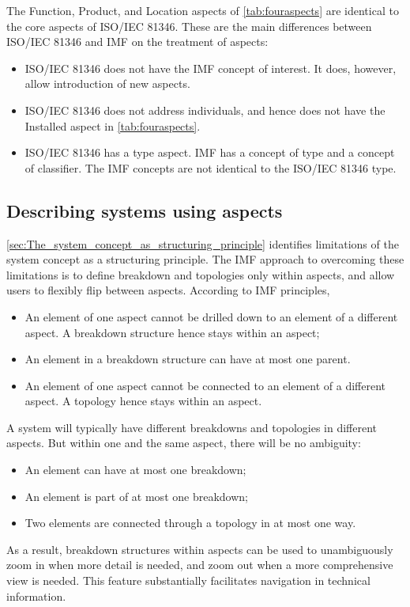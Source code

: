 \documentclass[../main.tex]{subfiles}
\begin{document}
The Function, Product, and Location aspects of \autoref{tab:fouraspects} are identical to the core aspects of ISO/IEC 81346. These are the main differences between ISO/IEC 81346 and IMF on the treatment of aspects:
\begin{itemize}
    \item ISO/IEC 81346 does not have the IMF concept of interest. It does, however, allow introduction of new aspects. 
    \item ISO/IEC 81346 does not address individuals, and hence does not have the Installed aspect in \autoref{tab:fouraspects}. 
    \item ISO/IEC 81346 has a type aspect. IMF has a concept of type and a concept of classifier. The IMF concepts are not identical to the ISO/IEC 81346 type. 
\end{itemize}

\subsection{Describing systems using aspects}
\autoref{sec:The_system_concept_as_structuring_principle} identifies
limitations of the system concept as a structuring principle. The IMF approach to overcoming these limitations  is to define breakdown and topologies only within aspects, and allow users to flexibly flip between aspects. According to IMF principles,
\begin{itemize}
    \item An element of one aspect cannot be drilled down to an element of a different aspect.  A breakdown structure hence stays within an aspect;
    \item  An element in a breakdown structure can have at most one parent. 
    \item  An element of one aspect cannot be connected to an element of a different aspect. A topology hence stays within an aspect. 
\end{itemize}
A system will typically have different breakdowns and topologies in different aspects. But within one and the same aspect, there will be no ambiguity: 
\begin{itemize}
    \item An element can have at most one breakdown;
    \item An element is part of at most one breakdown;
    \item Two elements are connected through a topology in at most one way.
 \end{itemize} 
As a result, breakdown structures within aspects can be used to unambiguously zoom in when more detail is needed, and zoom out when a more comprehensive view is needed. This feature substantially facilitates navigation in technical information.
\end{document}
